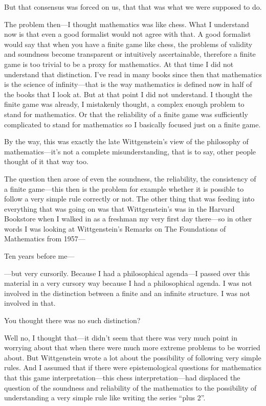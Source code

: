 But that consensus was forced on us, that that was what we 
were supposed to do. 

 The problem then---I thought mathematics was like chess. 
What I understand now is that even a good formalist would not agree 
with that. A good formalist would say that when you have a finite game 
like chess, the problems of validity and soundness become transparent 
or intuitively ascertainable, therefore a finite game is too trivial to be a
proxy for mathematics. At that time I did not understand that distinction. 
I've read in many books since then that mathematics is the science 
of infinity---that is the way mathematics is defined now in half of the 
books that I look at. But at that point I did not understand. I thought 
the finite game was already, I mistakenly thought, a complex enough 
problem to stand for mathematics. Or that the reliability of a finite 
game was sufficiently complicated to stand for mathematics so I basically 
focused just on a finite game. 

 By the way, this was exactly the late Wittgenstein's view of 
the philosophy of mathematics---it's not a complete misunderstanding, 
that is to say, other people thought of it that way too. 

 The question then arose of even the soundness, the reliability, 
the consistency of a finite game---this then is the problem for example 
whether it is possible to follow a very simple rule correctly or not. The 
other thing that was feeding into everything that was going on was that 
Wittgenstein's  was in 
the Harvard Bookstore when I walked in as a freshman my very first 
day there---so in other words I was looking at Wittgenstein's Remarks 
on The Foundations of Mathematics from 1957--- 

 Ten years before me--- 

 ---but very cursorily. Because I had a philosophical 
agenda---I passed over this material in a very cursory way because I had a 
philosophical agenda. I was not involved in the distinction between a 
finite and an infinite structure. I was not involved in that. 

 You thought there was no such distinction? 

 Well no, I thought that---it didn't seem that there was very 
much point in worrying about that when there were much more 
extreme problems to be worried about. But Wittgenstein wrote a lot 
about the possibility of following very simple rules. And I assumed that 
if there were epistemological questions for mathematics that this game 
interpretation---this chess interpretation---had displaced the question 
of the soundness and reliability of the mathematics to the possibility of 
understanding a very simple rule like writing the series \enquote{plus 2}. 

